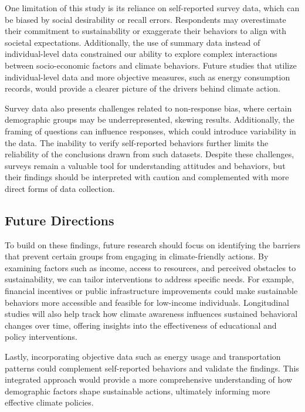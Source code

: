 \documentclass[
  letterpaper,
  DIV=11,
  numbers=noendperiod]{scrartcl}
\begin{document}
One limitation of this study is its reliance on self-reported survey
data, which can be biased by social desirability or recall errors.
Respondents may overestimate their commitment to sustainability or
exaggerate their behaviors to align with societal expectations.
Additionally, the use of summary data instead of individual-level data
constrained our ability to explore complex interactions between
socio-economic factors and climate behaviors. Future studies that
utilize individual-level data and more objective measures, such as
energy consumption records, would provide a clearer picture of the
drivers behind climate action.

Survey data also presents challenges related to non-response bias, where
certain demographic groups may be underrepresented, skewing results.
Additionally, the framing of questions can influence responses, which
could introduce variability in the data. The inability to verify
self-reported behaviors further limits the reliability of the
conclusions drawn from such datasets. Despite these challenges, surveys
remain a valuable tool for understanding attitudes and behaviors, but
their findings should be interpreted with caution and complemented with
more direct forms of data collection.

\subsection{Future Directions}\label{future-directions}

To build on these findings, future research should focus on identifying
the barriers that prevent certain groups from engaging in
climate-friendly actions. By examining factors such as income, access to
resources, and perceived obstacles to sustainability, we can tailor
interventions to address specific needs. For example, financial
incentives or public infrastructure improvements could make sustainable
behaviors more accessible and feasible for low-income individuals.
Longitudinal studies will also help track how climate awareness
influences sustained behavioral changes over time, offering insights
into the effectiveness of educational and policy interventions.

Lastly, incorporating objective data such as energy usage and
transportation patterns could complement self-reported behaviors and
validate the findings. This integrated approach would provide a more
comprehensive understanding of how demographic factors shape sustainable
actions, ultimately informing more effective climate policies.
\end{document}
